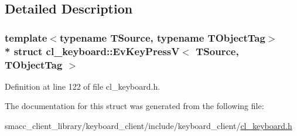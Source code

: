 \subsection{Detailed Description}
\subsubsection*{template$<$typename T\+Source, typename T\+Object\+Tag$>$\\*
struct cl\+\_\+keyboard\+::\+Ev\+Key\+Press\+V$<$ T\+Source, T\+Object\+Tag $>$}



Definition at line 122 of file cl\+\_\+keyboard.\+h.



The documentation for this struct was generated from the following file\+:\begin{DoxyCompactItemize}
\item 
smacc\+\_\+client\+\_\+library/keyboard\+\_\+client/include/keyboard\+\_\+client/\hyperlink{cl__keyboard_8h}{cl\+\_\+keyboard.\+h}\end{DoxyCompactItemize}
